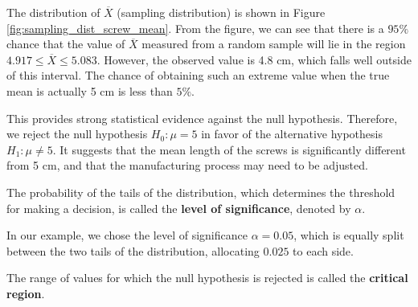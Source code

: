\documentclass[twoside]{book}
\begin{document}






The distribution of $\overline{X}$ (sampling distribution) is shown in Figure \ref{fig:sampling_dist_screw_mean}. From the figure, we can see that there is a $95\%$ chance that the value of $\overline{X}$ measured from a random sample will lie in the region $4.917 \leq \overline{X} \leq 5.083$. However, the observed value is 4.8 cm, which falls well outside of this interval. The chance of obtaining such an extreme value when the true mean is actually 5 cm is less than $5\%$.

This provides strong statistical evidence against the null hypothesis. Therefore, we reject the null hypothesis $H_0: \mu = 5$ in favor of the alternative hypothesis $H_1: \mu \ne 5$. It suggests that the mean length of the screws is significantly different from 5 cm, and that the manufacturing process may need to be adjusted.


\begin{textbox}
The probability of the tails of the distribution, which determines the threshold for making a decision, is called the \textbf{level of significance}, denoted by $\alpha$.
\end{textbox}
In our example, we chose the level of significance $\alpha = 0.05$, which is equally split between the two tails of the distribution, allocating $0.025$ to each side.

\begin{textbox}
The range of values for which the null hypothesis is
rejected is called the \textbf{critical region}.
\end{textbox}
\end{document}
